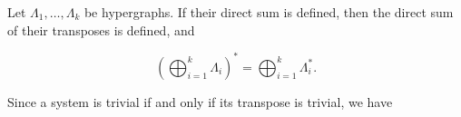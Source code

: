 Let $\Lambda_1, \ldots, \Lambda_k$ be hypergraphs. If their direct sum is defined, then the direct sum of their transposes is defined, and

$$\left( \bigoplus_{i=1}^{k} \Lambda_i \right)^* = \bigoplus_{i=1}^{k} \Lambda_i^*.$$

Since a system is trivial if and only if its transpose is trivial, we have
